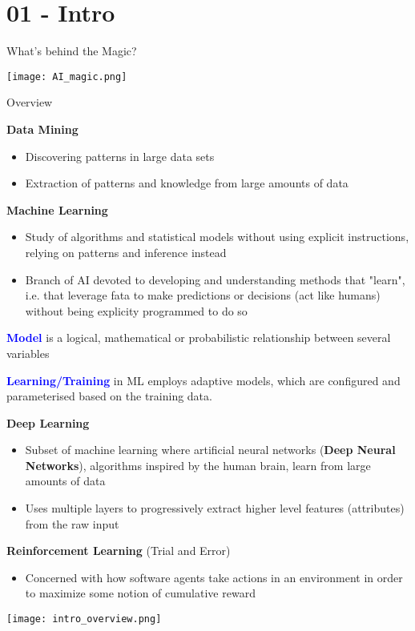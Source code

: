 \section{01 - Intro}

\begin{definition}{What's behind the Magic?} 

    \texttt{[image: AI\_magic.png]}
\end{definition}

\begin{theorem}{Overview}

    \textcolor{frog}{\textbf{Data Mining}}
    \begin{itemize}
        \item Discovering patterns in large data sets
        \item Extraction of patterns and knowledge from large amounts of data
    \end{itemize}

    \textcolor{frog}{\textbf{Machine Learning}}
    \begin{itemize}
        \item Study of algorithms and statistical models without using explicit instructions, relying on patterns and inference instead
        \item Branch of AI devoted to developing and understanding methods that "learn", i.e. that leverage fata to make predictions or decisions (act like humans) without being explicity programmed to do so
    \end{itemize}

    \textcolor{blue}{\textbf{Model}} is a logical, mathematical or probabilistic relationship between several variables

    \textcolor{blue}{\textbf{Learning/Training}} in ML employs adaptive models, which are configured and parameterised based on the training data.

    \textcolor{frog}{\textbf{Deep Learning}}
    \begin{itemize}
        \item Subset of machine learning where artificial neural networks (\textcolor{frog}{\textbf{Deep Neural Networks}}), algorithms inspired by the human brain, learn from large amounts of data
        \item Uses multiple layers to progressively extract higher level features (attributes) from the raw input
    \end{itemize}

    \textcolor{frog}{\textbf{Reinforcement Learning}} (Trial and Error)
    \begin{itemize}
        \item Concerned with how software agents take actions in an environment in order to maximize some notion of cumulative reward
    \end{itemize}

    \texttt{[image: intro\_overview.png]}
\end{theorem}

